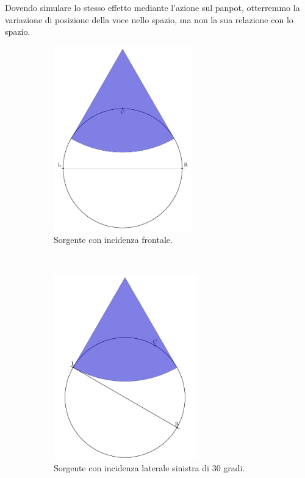 Dovendo simulare lo stesso effetto mediante l'azione sul panpot, otterremmo la
variazione di posizione della voce nello spazio, ma non la sua relazione con lo
spazio.

\begin{figure}[t!]
    \centering
    \begin{subfigure}[t]{0.45\textwidth}
        \centering
        \includegraphics[height=8cm]{CAPITOLI/_TIKZ/PANNING/pan-frontal}
        \caption{Sorgente con incidenza frontale.}
        \label{pan:frontal}
    \end{subfigure}%
    ~
    \begin{subfigure}[t]{0.45\textwidth}
        \centering
        \includegraphics[height=8cm]{CAPITOLI/_TIKZ/PANNING/pan-left}
        \caption{Sorgente con incidenza laterale sinistra di 30 gradi.}
        \label{pan:left}
    \end{subfigure}
    \\
    \begin{subfigure}[t]{0.9\textwidth}
        \centering

\end{subfigure}
\end{figure}
